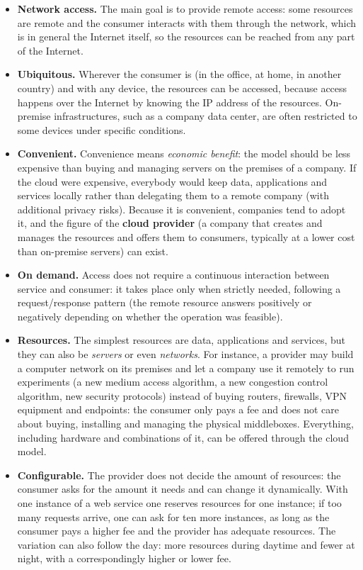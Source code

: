 \documentclass[11pt,a4paper,openany]{report}
\begin{document}
\begin{itemize}
	\item \textbf{Network access.} The main goal is to provide remote access: some resources are remote and the consumer interacts with them through the network, which is in general the Internet itself, so the resources can be reached from any part of the Internet.
	\item \textbf{Ubiquitous.} Wherever the consumer is (in the office, at home, in another country) and with any device, the resources can be accessed, because access happens over the Internet by knowing the IP address of the resources. On-premise infrastructures, such as a company data center, are often restricted to some devices under specific conditions.
	\item \textbf{Convenient.} Convenience means \emph{economic benefit}: the model should be less expensive than buying and managing servers on the premises of a company. If the cloud were expensive, everybody would keep data, applications and services locally rather than delegating them to a remote company (with additional privacy risks). Because it is convenient, companies tend to adopt it, and the figure of the \textbf{cloud provider} (a company that creates and manages the resources and offers them to consumers, typically at a lower cost than on-premise servers) can exist.
	\item \textbf{On demand.} Access does not require a continuous interaction between service and consumer: it takes place only when strictly needed, following a request/response pattern (the remote resource answers positively or negatively depending on whether the operation was feasible).
	\item \textbf{Resources.} The simplest resources are data, applications and services, but they can also be \emph{servers} or even \emph{networks}. For instance, a provider may build a computer network on its premises and let a company use it remotely to run experiments (a new medium access algorithm, a new congestion control algorithm, new security protocols) instead of buying routers, firewalls, VPN equipment and endpoints: the consumer only pays a fee and does not care about buying, installing and managing the physical middleboxes. Everything, including hardware and combinations of it, can be offered through the cloud model.
	\item \textbf{Configurable.} The provider does not decide the amount of resources: the consumer asks for the amount it needs and can change it dynamically. With one instance of a web service one reserves resources for one instance; if too many requests arrive, one can ask for ten more instances, as long as the consumer pays a higher fee and the provider has adequate resources. The variation can also follow the day: more resources during daytime and fewer at night, with a correspondingly higher or lower fee.

\end{itemize}
\end{document}
